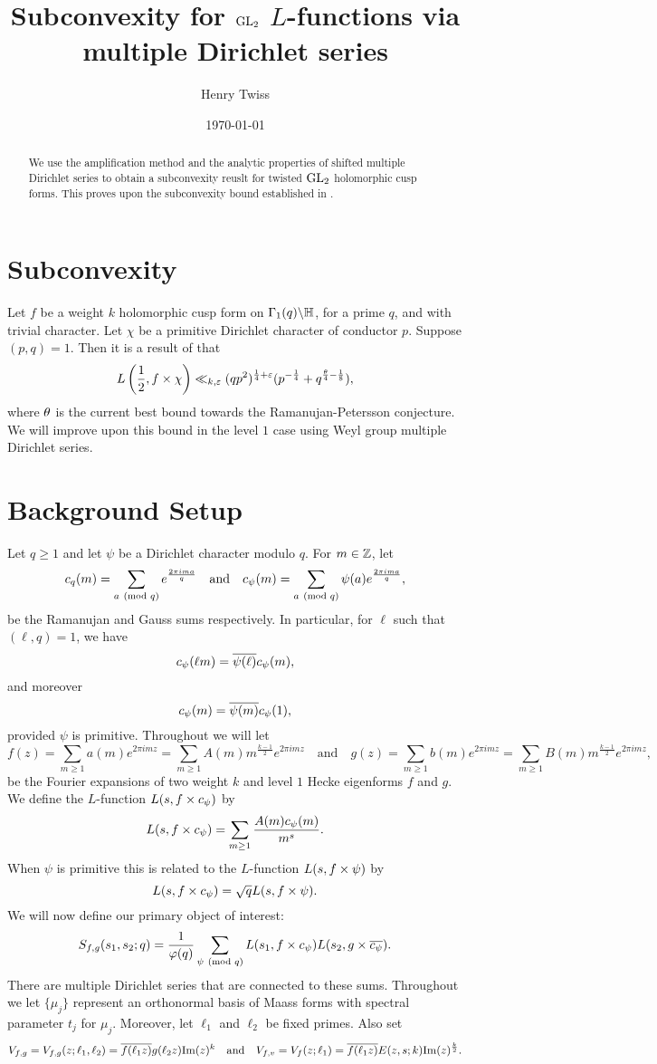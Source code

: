 \documentclass[12pt,reqno,oneside]{amsart}
\title{Subconvexity for $\mathrm{GL}_{2}$ $L$-functions via multiple Dirichlet series}
\author{Henry Twiss}
\date{\today}
\begin{document}
\begin{abstract}
  We use the amplification method and the analytic properties of shifted multiple Dirichlet series to obtain a subconvexity reuslt for twisted $\mathrm{GL}_{2}$ holomorphic cusp forms. This proves upon the subconvexity bound established in \cite{K}.
\end{abstract}

\maketitle

\section*{Subconvexity}
  Let $f$ be a weight $k$ holomorphic cusp form on $\Gamma_{1}(q)\backslash\mathbb{H}$, for a prime $q$, and with trivial character. Let $\chi$ be a primitive Dirichlet character of conductor $p$. Suppose $(p,q) = 1$. Then it is a result of \cite{K} that
  \[
    L\left(\frac{1}{2},f \times \chi\right) \ll_{k,\varepsilon}(qp^{2})^{\frac{1}{4}+\varepsilon}(p^{-\frac{1}{4}}+q^{\frac{\theta}{4}-\frac{1}{8}}),
  \]
  where $\theta$ is the current best bound towards the Ramanujan-Petersson conjecture. We will improve upon this bound in the level $1$ case using Weyl group multiple Dirichlet series.
\section{Background Setup}
  Let $q \ge 1$ and let $\psi$ be a Dirichlet character modulo $q$. For $m \in \mathbb{Z}$, let
  \[
    c_{q}(m) = \sum_{a \ \left(\text{mod }q\right)}e^{\frac{2\pi ima}{q}} \quad \text{and} \quad c_{\psi}(m) = \sum_{a \ \left(\text{mod }q\right)}\psi(a)e^{\frac{2\pi ima}{q}},
  \]
  be the Ramanujan and Gauss sums respectively. In particular, for $\ell$ such that $(\ell,q) = 1$, we have
  \[
    c_{\psi}(\ell m) = \overline{\psi(\ell)}c_{\psi}(m),
  \]
  and moreover
  \[
    c_{\psi}(m) = \overline{\psi(m)}c_{\psi}(1),
  \]
  provided $\psi$ is primitive. Throughout we will let
  \[
    f(z) = \sum_{m \ge 1}a(m)e^{2\pi imz} = \sum_{m \ge 1}A(m)m^{\frac{k-1}{2}}e^{2\pi imz} \quad \text{and} \quad g(z) = \sum_{m \ge 1}b(m)e^{2\pi imz} = \sum_{m \ge 1}B(m)m^{\frac{k-1}{2}}e^{2\pi imz},
  \]
  be the Fourier expansions of two weight $k$ and level $1$ Hecke eigenforms $f$ and $g$. We define the $L$-function $L(s,f \times c_{\psi})$ by
  \[
    L(s,f \times c_{\psi}) = \sum_{m \ge 1}\frac{A(m)c_{\psi}(m)}{m^{s}}.
  \]
  When $\psi$ is primitive this is related to the $L$-function $L(s,f \times \psi)$ by
  \[
    L(s,f \times c_{\psi}) = \sqrt{q}L(s,f \times \psi).
  \]
  We will now define our primary object of interest:
  \[
    S_{f,g}(s_{1},s_{2};q) = \frac{1}{\varphi(q)}\sum_{\psi \ \left(\text{mod }q\right)}L(s_{1},f \times c_{\psi})L(s_{2},g \times \overline{c_{\psi}}).
  \]
  There are multiple Dirichlet series that are connected to these sums. Throughout we let $\{\mu_{j}\}$ represent an orthonormal basis of Maass forms with spectral parameter $t_{j}$ for $\mu_{j}$. Moreover, let $\ell_{1}$ and $\ell_{2}$ be fixed primes. Also set
  \[
    V_{f,g} = V_{f,g}(z;\ell_{1},\ell_{2}) = \overline{f(\ell_{1}z)}g(\ell_{2}z)\mathrm{Im}(z)^{k} \quad \text{and} \quad V_{f,v} = V_{f}(z;\ell_{1}) = \overline{f(\ell_{1}z)}E(z,s;k)\mathrm{Im}(z)^{\frac{k}{2}}.
  \]
\end{document}

